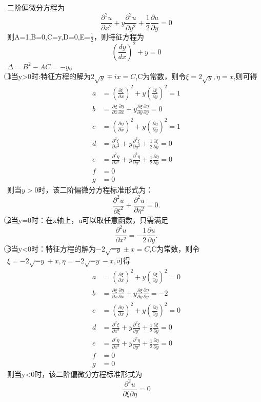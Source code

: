 \documentclass[10.5pt]{article}
\begin{document}
\subsection{}
二阶偏微分方程为$$\frac{\partial^2u}{\partial x^2}+y\frac{\partial^2u}{\partial y^2}+\frac{1}{2}\frac{\partial u}{\partial y}=0$$\indent
则A=1,B=0,C=y,D=0,E=$\frac{1}{2}$，则特征方程为$$\left(\frac{dy}{dx}\right)^2+y=0$$ \indent$\Delta=B^2-AC=-y$。\\\indent
\textcircled{1}当y>0时:特征方程的解为$2\sqrt{y}\mp ix=C$,C为常数，则令$\xi=2\sqrt{y},\eta=x$,则可得
$$\begin{aligned}
    a&=\left(\frac{\partial\xi}{\partial x}\right)^2+y\left(\frac{\partial\xi}{\partial y}\right)^2=1\\
    b&=\frac{\partial\xi}{\partial x}\frac{\partial\eta}{\partial x}+y\frac{\partial\xi}{\partial y}\frac{\partial\eta}{\partial y}=0\\
    c&=\left(\frac{\partial\eta}{\partial x}\right)^2+y\left(\frac{\partial\eta}{\partial y}\right)^2=1\\
    d&=\frac{\partial^2\xi}{\partial x^2}+y\frac{\partial^2\xi}{\partial y^2}+\frac{1}{2}\frac{\partial\xi}{\partial y}=0\\
    e&=\frac{\partial^2\eta}{\partial x^2}+y\frac{\partial^2\eta}{\partial y^2}+\frac{1}{2}\frac{\partial\eta}{\partial y}=0\\
    f&=0\\
    g&=0
\end{aligned}$$\indent
则当$y>0$时，该二阶偏微分方程标准形式为：$$\frac{\partial^2u}{\partial\xi^2}+\frac{\partial^2u}{\partial\eta^2}=0.$$\indent
\textcircled{2}当y=0时：在x轴上，u可以取任意函数，只需满足$$\frac{\partial^2u}{\partial x^2}=-\frac{1}{2}\frac{\partial u}{\partial y}.$$\indent
\textcircled{3}当y<0时：特征方程的解为$-2\sqrt{-y}\pm x=C$,C为常数，则令$\xi=-2\sqrt{-y}+x,\eta=-2\sqrt{-y}-x$,可得
$$\begin{aligned}
    a&=\left(\frac{\partial\xi}{\partial x}\right)^2+y\left(\frac{\partial\xi}{\partial y}\right)^2=0\\
    b&=\frac{\partial\xi}{\partial x}\frac{\partial\eta}{\partial x}+y\frac{\partial\xi}{\partial y}\frac{\partial\eta}{\partial y}=-2\\
    c&=\left(\frac{\partial\eta}{\partial x}\right)^2+y\left(\frac{\partial\eta}{\partial y}\right)^2=0\\
    d&=\frac{\partial^2\xi}{\partial x^2}+y\frac{\partial^2\xi}{\partial y^2}+\frac{1}{2}\frac{\partial\xi}{\partial y}=0\\
    e&=\frac{\partial^2\eta}{\partial x^2}+y\frac{\partial^2\eta}{\partial y^2}+\frac{1}{2}\frac{\partial\eta}{\partial y}=0\\
    f&=0\\
    g&=0
\end{aligned}$$\indent
则当y<0时，该二阶偏微分方程标准形式为$$\frac{\partial^2u}{\partial\xi\partial\eta}=0$$
\end{document}

